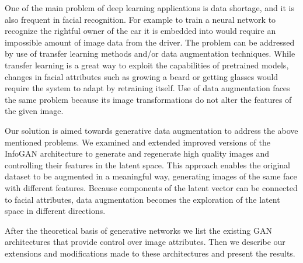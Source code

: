 \documentclass[10pt,journal,compsoc]{IEEEtran}
\begin{document}
One of the main problem of deep learning applications is data shortage, and it is also frequent in facial recognition. For example to train a neural network to recognize the rightful owner of the car it is embedded into would require an impossible amount of image data from the driver. The problem can be addressed by use of transfer learning methods and/or data augmentation techniques. While transfer learning is a great way to exploit the capabilities of pretrained models, changes in facial attributes such as growing a beard or getting glasses would require the system to adapt by retraining itself. Use of data augmentation faces the same problem because its image transformations do not alter the features of the given image.

Our solution is aimed towards generative data augmentation to address the above mentioned problems. We examined and extended improved versions of the InfoGAN architecture to generate and regenerate high quality images and controlling their features in the latent space. This approach enables the original dataset to be augmented in a meaningful way, generating images of the same face with different features. Because components of the latent vector can be connected to facial attributes, data augmentation becomes the exploration of the latent space in different directions.

After the theoretical basis of generative networks we list the existing GAN architectures that provide control over image attributes. Then we describe our extensions and modifications made to these architectures and present the results.



 

%
%
\end{document}
